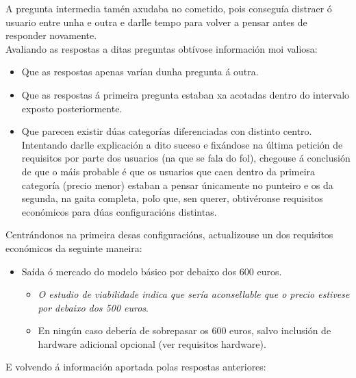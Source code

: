   A pregunta intermedia tamén axudaba no cometido, pois conseguía distraer ó
  usuario entre unha e outra e darlle tempo para volver a pensar antes de
  responder novamente. \\

  Avaliando as respostas a ditas preguntas obtívose información moi valiosa:

  \begin{itemize}
   \item Que as respostas apenas varían dunha pregunta á outra.
   \item Que as respostas á primeira pregunta estaban xa acotadas dentro do
         intervalo exposto posteriormente.
   \item Que parecen existir dúas categorías diferenciadas con distinto centro.
         Intentando darlle explicación a dito suceso e fixándose na última
         petición de requisitos por parte dos usuarios (na que se fala do fol),
         chegouse á conclusión de que o máis probable é que os usuarios que caen
         dentro da primeira categoría (precio menor) estaban a pensar
         únicamente no punteiro e os da segunda, na gaita completa, polo que,
         sen querer, obtivéronse requisitos económicos para dúas
         configuracións distintas.
  \end{itemize}

  Centrándonos na primeira desas configuracións, actualizouse un dos requisitos
  económicos da seguinte maneira:

  \begin{itemize}
   \item Saída ó mercado do modelo básico por debaixo dos 600 euros.
         \begin{itemize}
          \item \textit{O estudio de viabilidade indica que sería aconsellable
                 que o precio estivese por debaixo dos 500 euros}.
          \item En ningún caso debería de sobrepasar os 600 euros, salvo
                inclusión de hardware adicional opcional (ver requisitos
                hardware).
         \end{itemize}
  \end{itemize}

  E volvendo á información aportada polas respostas anteriores:

